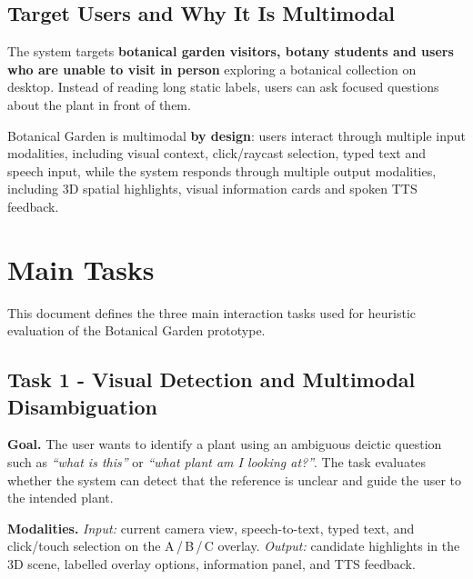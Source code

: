 \documentclass[12pt,a4paper]{article}
\newcommand{\tasksub}[1]{\par\smallskip\noindent\textbf{#1}\quad\ignorespaces}
\begin{document}
\subsection{Target Users and Why It Is Multimodal}
The system targets \textbf{botanical garden visitors, botany students and users who are unable to visit in person} exploring a botanical collection on desktop. Instead of reading long static labels, users can ask focused questions about the plant in front of them.

Botanical Garden is multimodal \textbf{by design}: users interact through
multiple input modalities, including visual context, click/raycast selection,
typed text and speech input, while the system responds through multiple output
modalities, including 3D spatial highlights, visual information cards and
spoken TTS feedback. 

\section{Main Tasks}
This document defines the three main interaction tasks used for heuristic
evaluation of the Botanical Garden prototype.

\subsection{Task 1 - Visual Detection and Multimodal Disambiguation}
\tasksub{Goal.} The user wants to identify a plant using an ambiguous
deictic question such as \emph{``what is this''} or \emph{``what plant am I
looking at?''}. The task evaluates whether the system can detect that the
reference is unclear and guide the user to the intended plant.

\tasksub{Modalities.} \emph{Input:} current camera view, speech-to-text,
typed text, and click/touch selection on the A\,/\,B\,/\,C overlay.
\emph{Output:} candidate highlights in the 3D scene, labelled overlay
options, information panel, and TTS feedback.
\end{document}
